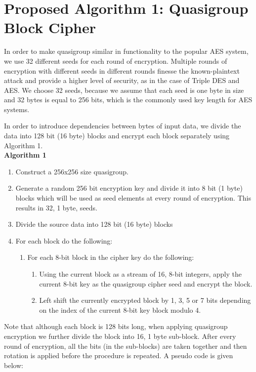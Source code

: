 \documentclass[conference]{IEEEtran}
\begin{document}
\section{Proposed Algorithm 1: Quasigroup Block Cipher}
In order to make quasigroup similar in functionality to the popular AES system, we use 32 different seeds for each round of encryption. Multiple rounds of encryption with different seeds in different rounds finesse the known-plaintext attack and provide a higher level of security, as in the case of Triple DES and AES. We choose 32 seeds, because we assume that each seed is one byte in size and 32 bytes is equal to 256 bits, which is the commonly used key length for AES systems.

In order to introduce dependencies between bytes of input data, we divide the data into 128 bit (16 byte) blocks and encrypt each block separately using Algorithm 1.\\

\noindent\textbf{Algorithm 1}
\begin{enumerate}
  \item Construct a 256x256 size quasigroup.
  \item Generate a random 256 bit encryption key and divide it into 8 bit (1 byte) blocks which will be used as seed elements at every round of encryption. This results in 32, 1 byte, seeds.
  \item Divide the source data into 128 bit (16 byte) blocks
  \item For each block do the following:
  \begin{enumerate}
    \item For each 8-bit block in the cipher key do the following:
    \begin{enumerate}
      \item Using the current block as a stream of 16, 8-bit integers, apply the current 8-bit key as the quasigroup cipher seed and encrypt the block.
      \item Left shift the currently encrypted block by 1, 3, 5 or 7 bits depending on the index of the current 8-bit key block modulo 4.
    \end{enumerate}
  \end{enumerate}
\end{enumerate}

Note that although each block is 128 bits long, when applying quasigroup encryption we further divide the block into 16, 1 byte sub-block. After every round of encryption, all the bits (in the sub-blocks) are taken together and then rotation is applied before the procedure is repeated. A pseudo code is given below:\\
\end{document}

